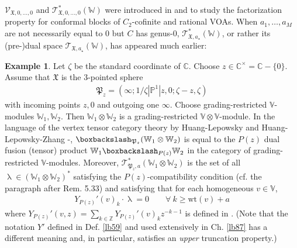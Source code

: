 \documentclass[11pt,b5paper,notitlepage]{article}
\theoremstyle{definition}
\newtheorem{eg}[df]{Example}
\theoremstyle{plain}
\newcommand{\fk}{\mathfrak}
\newcommand{\scr}{\mathscr}
\newcommand{\Vbb}{\mathbb V}
\newcommand{\Wbb}{\mathbb W}
\newcommand{\Cbb}{\mathbb C}
\newcommand{\Zbb}{\mathbb Z}
\newcommand{\Pbb}{\mathbb P}
\newcommand{\wt}{\mathrm{wt}}
\newcommand{\<}{\left\langle}
\renewcommand{\>}{\right\rangle}
\newcommand{\fx}{\mathfrak{X}}
\newcommand{\bbs}{\boxbackslash}
\numberwithin{equation}{section}
\begin{document}
$\scr V_{\fx,0,\dots,0}$ and $\scr T_{\fx,0,\dots,0}^*(\Wbb)$ were introduced in \cite[Sec. 7.2]{NT-P1_conformal_blocks} and \cite[Sec. 6.2]{DGT2} to study the factorization property for conformal blocks of $C_2$-cofinite and rational VOAs. When $a_1,\dots,a_M$ are not necessarily equal to $0$ but $C$ has genus-$0$, $\scr T_{\fx,a_\star}^*(\Wbb)$, or rather its (pre-)dual space $\scr T_{\fx,a_\star}(\Wbb)$, has appeared much earlier:


\begin{eg}
Let $\zeta$ be the standard coordinate of $\Cbb$. Choose $z\in\Cbb^\times=\Cbb-\{0\}$. Assume that $\fk X$ is the $3$-pointed sphere
\begin{align}
\fk P_z=(\infty;1/\zeta| \Pbb^1|z,0;\zeta-z,\zeta)
\end{align}
with incoming points $z,0$ and outgoing one $\infty$. Choose grading-restricted $\Vbb$-modules $\Wbb_1,\Wbb_2$. Then $\Wbb_1\otimes\Wbb_2$ is a grading-restricted $\Vbb\otimes\Vbb$-module. In the language of the vertex tensor category theory by Huang-Lepowsky \cite{HL-tensor-1,HL-tensor-2,HL-tensor-3,Hua-tensor-4} and Huang-Lepowsky-Zhang \cite{HLZ1,HLZ2}-\cite{HLZ8}, $\bbs_{\fk P_z}(\Wbb_1\otimes \Wbb_2)$ is equal to the $P(z)$ dual fusion (tensor) product $\Wbb_1\bbs_{P(z)}\Wbb_2$ in the category of grading-restricted $\Vbb$-modules. Moreover, $\scr T_{\fk P_z,a}^*(\Wbb_1\otimes\Wbb_2)$ is the set of all $\uplambda\in(\Wbb_1\otimes\Wbb_2)^*$ satisfying the $P(z)$-compatibility condition (cf. \cite[Sec. 5.2]{HLZ4} the paragraph after Rem. 5.33) and satisfying that for each homogeneous $v\in \Vbb$,
\begin{align}
Y_{P(z)}'(v)_k\cdot\uplambda=0\qquad\forall~k\geq\wt(v)+a
\end{align}
where $Y_{P(z)}'(v,z)=\sum_{k\in\Zbb}Y_{P(z)}'(v)_kz^{-k-1}$ is defined in \cite[Def. 5.3]{HLZ4}. (Note that the notation $Y'$ defined in Def. \ref{lb59} and used extensively in Ch. \ref{lb87} has a different meaning and, in particular, satisfies an \emph{upper} truncation property.)
\end{eg}
\end{document}
